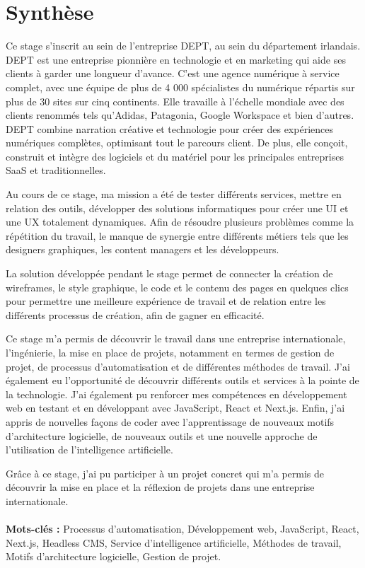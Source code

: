 \chapter*{Synthèse}

Ce stage s'inscrit au sein de l'entreprise DEPT, au sein du département irlandais. DEPT est une entreprise pionnière en technologie et en marketing qui aide ses clients à garder une longueur d'avance. C'est une agence numérique à service complet, avec une équipe de plus de 4 000 spécialistes du numérique répartis sur plus de 30 sites sur cinq continents. Elle travaille à l'échelle mondiale avec des clients renommés tels qu'Adidas, Patagonia, Google Workspace et bien d'autres. DEPT combine narration créative et technologie pour créer des expériences numériques complètes, optimisant tout le parcours client. De plus, elle conçoit, construit et intègre des logiciels et du matériel pour les principales entreprises SaaS et traditionnelles.

Au cours de ce stage, ma mission a été de tester différents services, mettre en relation des outils, développer des solutions informatiques pour créer une UI et une UX totalement dynamiques. Afin de résoudre plusieurs problèmes comme la répétition du travail, le manque de synergie entre différents métiers tels que les designers graphiques, les content managers et les développeurs.

La solution développée pendant le stage permet de connecter la création de wireframes, le style graphique, le code et le contenu des pages en quelques clics pour permettre une meilleure expérience de travail et de relation entre les différents processus de création, afin de gagner en efficacité.

Ce stage m'a permis de découvrir le travail dans une entreprise internationale, l'ingénierie, la mise en place de projets, notamment en termes de gestion de projet, de processus d'automatisation et de différentes méthodes de travail. J'ai également eu l'opportunité de découvrir différents outils et services à la pointe de la technologie. J'ai également pu renforcer mes compétences en développement web en testant et en développant avec JavaScript, React et Next.js. Enfin, j'ai appris de nouvelles façons de coder avec l'apprentissage de nouveaux motifs d'architecture logicielle, de nouveaux outils et une nouvelle approche de l'utilisation de l'intelligence artificielle.

Grâce à ce stage, j'ai pu participer à un projet concret qui m'a permis de découvrir la mise en place et la réflexion de projets dans une entreprise internationale.
\\ \\
\textbf{Mots-clés :} Processus d'automatisation, Développement web, JavaScript, React, Next.js, Headless CMS, Service d'intelligence artificielle, Méthodes de travail, Motifs d'architecture logicielle, Gestion de projet.
